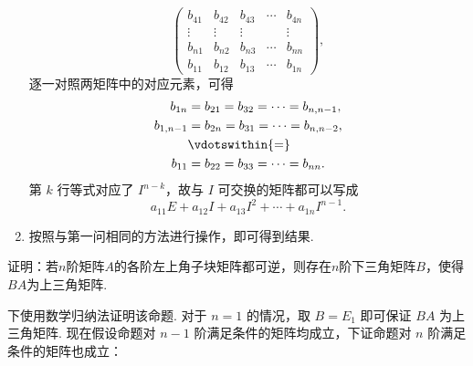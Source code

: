 \begin{exercise}
\begin{exgroup}
\begin{answer}
\begin{enumerate}
\[\begin{pmatrix}
                            b_{41} & b_{42} & b_{43} & \cdots & b_{4n} \\
                            \vdots & \vdots & \vdots &        & \vdots \\
                            b_{n1} & b_{n2} & b_{n3} & \cdots & b_{nn} \\
                            b_{11} & b_{12} & b_{13} & \cdots & b_{1n}
                        \end{pmatrix},
                    \]
                    逐一对照两矩阵中的对应元素，可得
                    \begin{align*}
                        b_{1n} &= b_{21} = b_{32} = \cdots = b_{n,n-1}, \\
                        b_{1,n-1} &= b_{2n} = b_{31} = \cdots = b_{n,n-2}, \\
                        &\vdotswithin{=} \\
                        b_{11} &= b_{22} = b_{33} = \cdots = b_{nn}.
                    \end{align*}
                    第 $k$ 行等式对应了 $I^{n-k}$，故与 $I$ 可交换的矩阵都可以写成
                    \[
                        a_{11}E + a_{12}I + a_{13}I^2 + \cdots + a_{1n}I^{n-1}.
                    \]

                \item 按照与第一问相同的方法进行操作，即可得到结果.
            \end{enumerate}
        \end{answer}

        \item 证明：若$n$阶矩阵$A$的各阶左上角子块矩阵都可逆，则存在$n$阶下三角矩阵$B$，使得$BA$为上三角矩阵.
        \begin{answer}
            下使用数学归纳法证明该命题. 对于 $n=1$ 的情况，取 $B=E_1$ 即可保证 $BA$ 为上三角矩阵. 现在假设命题对 $n-1$ 阶满足条件的矩阵均成立，下证命题对 $n$ 阶满足条件的矩阵也成立：


\end{answer}
\end{exgroup}
\end{exercise}

